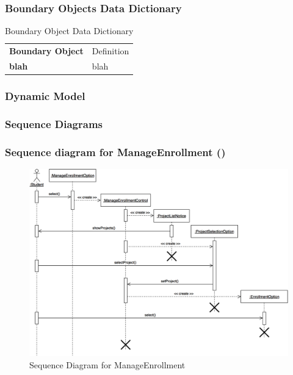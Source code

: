 \documentclass[12pt,letterpaper]{article}
\begin{document}
\subsubsection*{Boundary Objects Data Dictionary}

\begin{table}[H]
\caption{Boundary Object Data Dictionary}
	\begin{tabu} to 
		\tableheader{}Boundary Object & Definition\\
		blah & blah\\
		
	\end{tabu}
\end{table}

\subsubsection{Dynamic Model}

\subsubsection*{Sequence Diagrams}

\subsubsection*{Sequence diagram for ManageEnrollment (\manageenrollment{})}

\begin{figure}[H]
	\centering{}
	\includegraphics[scale=0.3]{imgs/seq/manage-enrollment.png}
	\caption{Sequence Diagram for ManageEnrollment}
\end{figure}
\end{document}

